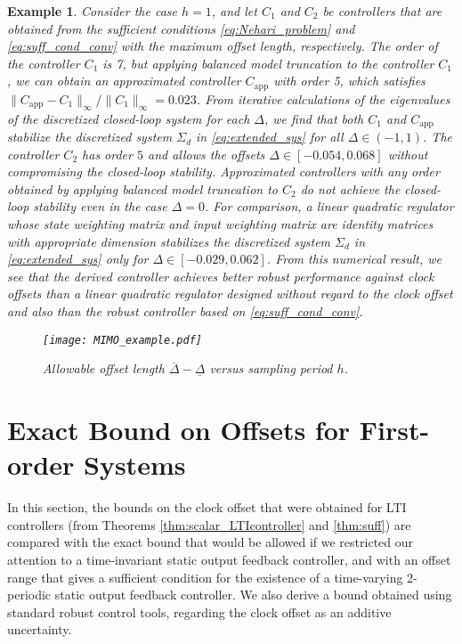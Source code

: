 \documentclass[letterpaper, 12pt, draftcls, onecolumn]{ieeeconf}
\newtheorem{example}[theorem]{Example}
\begin{document}
\begin{example}
Consider the case $h = 1$, and let  $C_1$ and $C_2$ be
controllers that are obtained from the sufficient conditions 
\eqref{eq:Nehari_problem}  and  \eqref{eq:suff_cond_conv} with
the maximum offset length, respectively.
The order of the controller $C_1$ 
is 7, but 
applying balanced model truncation \cite[Chap.~6]{zhou1996}
to the controller $C_{1}$,
we can obtain
an approximated controller $C_{\text{app}}$ with order 5,
which 
satisfies 
$\|C_{\text{app}} - C_{1}\|_{\infty} / \|C_1\|_{\infty} = 0.023$.
From
iterative calculations of the eigenvalues of the 
discretized closed-loop system for each $\Delta$,
we find that both $C_{1}$ and $C_{\text{app}}$
stabilize the discretized system $\Sigma_d$ in \eqref{eq:extended_sys} 
for all $\Delta \in (-1,1)$.
The controller $C_2$
has order $5$ and
allows the offsets $\Delta \in [-0.054,0.068]$ without compromising the closed-loop stability.
Approximated controllers with any order obtained by applying balanced 
model truncation to $C_2$
do not achieve the closed-loop stability even in the case $\Delta = 0$.
For comparison, a linear quadratic regulator whose state weighting matrix  and
input weighting matrix are identity matrices with appropriate dimension stabilizes
the discretized system $\Sigma_d$ in \eqref{eq:extended_sys} 
only for $\Delta \in [-0.029,0.062]$.
From this numerical result, we see that
the derived controller achieves better robust performance against clock offsets 
than
a linear quadratic regulator designed without regard to the clock offset and
also than the robust controller based on \eqref{eq:suff_cond_conv}.

\begin{figure}[tb]
	\centering
	\texttt{[image: MIMO\_example.pdf]}
	\caption{Allowable offset length $\overline \Delta - \underline \Delta$ versus sampling period $h$.}
	\label{fig:MIMO_ex}
\end{figure}	
\end{example}


\section{Exact Bound on Offsets for First-order Systems}
In this section, the bounds
on the clock offset
that were obtained for LTI controllers 
(from Theorems \ref{thm:scalar_LTIcontroller} 
and \ref{thm:suff}) are compared with
the exact bound that would be allowed 
if we restricted our attention to a time-invariant 
static output feedback controller, and with
an offset range that gives a sufficient condition 
for the existence of a time-varying 
2-periodic static output feedback controller.
We also derive a bound obtained using 
standard robust control tools, regarding the clock offset as an
additive uncertainty.
\end{document}
